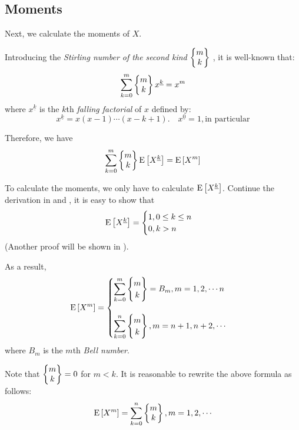 \subsection{Moments}
\label{sec:moments}
Next, we calculate the moments of $ X$.

Introducing the \emph{Stirling number of the second kind}\cite{wiki_stir}  $ \left\{\begin{matrix}m\\k\end{matrix}\right\} $ , it is well-known that:
\[ \sum_{k=0}^m\Stir{m}{k}x^{\underline{k}} = x^m\]
where $ x^{\underline{k}}$ is the $ k$th \emph{falling factorial} of $ x$ defined by:
\[ x^{\underline{k}} = x(x-1)\cdots (x-k+1). \quad x^{\underline{0}} = 1, \text{in particular}\]

Therefore, we have
\[ \sum_{k=0}^m\Stir{m}{k}\E{X^{\underline{k}}} = \E{X^m}\]

To calculate the moments, we only have to calculate $ \text{E}\left[X^{\underline{k}}\right]$.
Continue the derivation in  and , it is easy to show that
\[ \text{E}\left[X^{\underline{k}}\right] =\begin{cases} 1, 0\le k\le n\\
0,  k>n\end{cases} \]
(Another proof
will be shown in ).

As a result,
 \begin{equation*}
 \E{X^m} =\begin{cases} \sum_{k=0}^m\Stir{m}{k} = B_m, m = 1,2,\cdots n \\
   \\
  \sum_{k=0}^n\Stir{m}{k}, m  = n+1, n+2,\cdots \end{cases}
  \end{equation*}
where $ B_m$ is the $ m$th \emph{Bell number}\cite{wiki_bell}.

Note that $ \left\{\begin{matrix}m\\k\end{matrix}\right\} = 0$ for $ m < k$. It is reasonable to rewrite the above formula as follows:
\begin{equation}
  \E{X^m} = \sum_{k=0}^n\Stir{m}{k}, m=1,2,\cdots
  \label{eqn:moments}
\end{equation}

